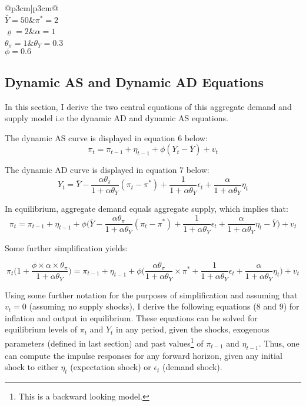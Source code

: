 \documentclass[12pt]{article}
\makeatletter
\newcommand\Taccount[3][3cm]%
{{\renewcommand\arraystretch{1.3}%
		\begin{adjustbox}{width=0.4\textwidth}
		\begin{tabular}[t]{@{}p{#1}|p{#1}@{}}
			\multicolumn{2}{@{}c@{}}{#2}\\
			\hline
			\hline
			#3
		\end{tabular}%
		\end{adjustbox}
	
}}
\newcommand{\1}{\mathbbm 1}
\renewcommand{\rho}{\varrho}
\makeatother
\begin{document}
	
	\begin{center}
		\Taccount{Model Parameters}{$\bar{Y} = 50$&$\pi^{*} = 2$\\$\rho = 2$&$\alpha=1$\\$\theta_{\pi} = 1$&$\theta_{Y} = 0.3$\\$\phi = 0.6$}
	\end{center}
		
		\subsection{Dynamic AS and Dynamic AD Equations}
		
		In this section, I derive the two central equations of this aggregate demand and supply model i.e the dynamic AD and dynamic AS equations. 
		
		The dynamic AS curve is displayed in equation 6 below:
			\begin{equation}
			\pi_{t} = \pi_{t-1} + \eta_{t-1} + \phi (Y_{t} - \bar{Y}) + v_{t}
		\end{equation}
	
	The dynamic AD curve is displayed in equation 7 below:
		\begin{equation}
		Y_{t} = \bar{Y} - \frac{\alpha \theta_{\pi}}{1 + \alpha \theta_{Y}}(\pi_{t} - \pi^{*}) + \frac{1}{1 + \alpha \theta_{Y}} \epsilon_{t} + \frac{\alpha}{1 + \alpha \theta_{Y}} \eta_{t}
	\end{equation}

In equilibrium, aggregate demand equals aggregate supply, which implies that:
\begin{equation*}
\pi_{t} = \pi_{t-1} + \eta_{t-1} + \phi\bigg(\bar{Y} - \frac{\alpha \theta_{\pi}}{1 + \alpha \theta_{Y}}(\pi_{t} - \pi^{*}) + \frac{1}{1 + \alpha \theta_{Y}} \epsilon_{t} + \frac{\alpha}{1 + \alpha \theta_{Y}} \eta_{t} - \bar{Y}\bigg) + v_{t}
\end{equation*}

Some further simplification yields:

\begin{equation*}
	\pi_{t}\bigg(1 +  \frac{\phi \times \alpha \times \theta_{\pi}}{1 + \alpha \theta_{Y}}\bigg)  = \pi_{t-1} + \eta_{t-1} + \phi\bigg(\frac{\alpha \theta_{\pi}}{1 + \alpha \theta_{Y}} \times \pi^{*} + \frac{1}{1 + \alpha \theta_{Y}} \epsilon_{t} + \frac{\alpha}{1 + \alpha \theta_{Y}} \eta_{t} \bigg) + v_{t}
\end{equation*}

Using some further notation for the purposes of simplification and assuming that $v_{t} = 0$ (assuming no supply shocks), I derive the following equations ($8$ and $9$) for inflation and output in equilibrium. These equations can be solved for equilibrium levels of $\pi_{t}$ and $Y_{t}$ in any period, given the shocks, exogenous parameters (defined in last section) and past values\footnote{This is a backward looking model.} of $\pi_{t-1}$ and $\eta_{t-1}$. Thus, one can compute the impulse responses for any forward horizon, given any initial shock to either $\eta_{t}$ (expectation shock) or $\epsilon_{t}$ (demand shock). 
\end{document}
